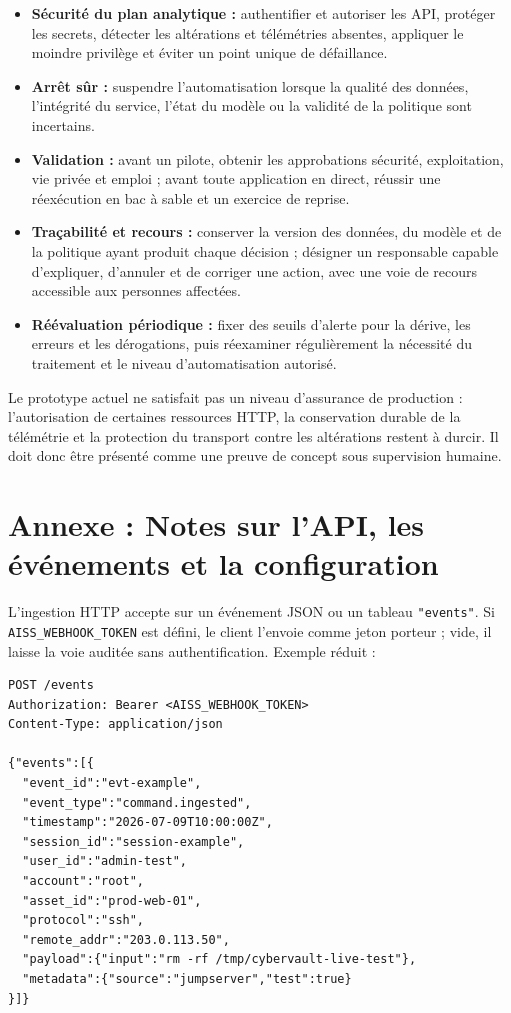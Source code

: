 \documentclass[11pt,a4paper,oneside]{report}
\theoremstyle{definition}
\theoremstyle{plain}
\begin{document}
\begin{itemize}[leftmargin=*]
  \item \textbf{Sécurité du plan analytique :} authentifier et autoriser les
  API, protéger les secrets, détecter les altérations et télémétries absentes,
  appliquer le moindre privilège et éviter un point unique de défaillance.

  \item \textbf{Arrêt sûr :} suspendre l'automatisation lorsque la qualité des
  données, l'intégrité du service, l'état du modèle ou la validité de la
  politique sont incertains.

  \item \textbf{Validation :} avant un pilote, obtenir les approbations
  sécurité, exploitation, vie privée et emploi ; avant toute application en
  direct, réussir une réexécution en bac à sable et un exercice de reprise.

  \item \textbf{Traçabilité et recours :} conserver la version des données,
  du modèle et de la politique ayant produit chaque décision ; désigner un
  responsable capable d'expliquer, d'annuler et de corriger une action, avec
  une voie de recours accessible aux personnes affectées.

  \item \textbf{Réévaluation périodique :} fixer des seuils d'alerte pour la
  dérive, les erreurs et les dérogations, puis réexaminer régulièrement la
  nécessité du traitement et le niveau d'automatisation autorisé.
\end{itemize}

Le prototype actuel ne satisfait pas un niveau d'assurance de production :
l'autorisation de certaines ressources HTTP, la conservation durable de la
télémétrie et la protection du transport contre les altérations restent à
durcir. Il doit donc être présenté comme une preuve de concept sous supervision
humaine.

\chapter{Annexe : Notes sur l'API, les événements et la configuration}
\label{app:api}

L'ingestion HTTP accepte sur  un événement JSON ou un tableau
\texttt{"events"}. Si \texttt{AISS\_WEBHOOK\_TOKEN} est défini, le client
l'envoie comme jeton porteur ; vide, il laisse la voie auditée sans
authentification. Exemple réduit :

\begin{verbatim}
POST /events
Authorization: Bearer <AISS_WEBHOOK_TOKEN>
Content-Type: application/json

{"events":[{
  "event_id":"evt-example",
  "event_type":"command.ingested",
  "timestamp":"2026-07-09T10:00:00Z",
  "session_id":"session-example",
  "user_id":"admin-test",
  "account":"root",
  "asset_id":"prod-web-01",
  "protocol":"ssh",
  "remote_addr":"203.0.113.50",
  "payload":{"input":"rm -rf /tmp/cybervault-live-test"},
  "metadata":{"source":"jumpserver","test":true}
}]}
\end{verbatim}
\end{document}
